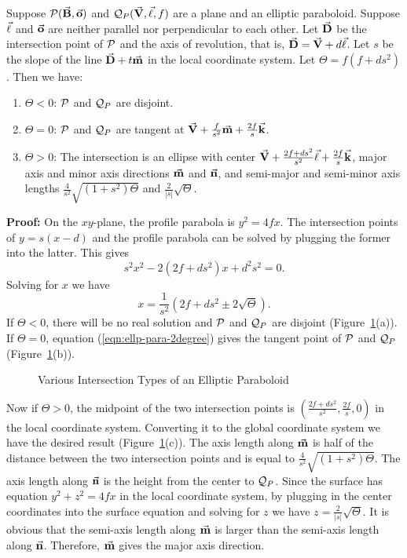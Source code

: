 \begin{theorem}
\label{thm:elliptic-paraboloid}
     Suppose ${\cal P}(\vec{\bf B},\vec{\bf o})$ and
${\cal Q}_P(\vec{\bf V},\vec{\bf \ell},f)$ are a plane and an elliptic paraboloid.
Suppose $\vec{\bf \ell}$ and $\vec{\bf o}$ are neither parallel nor perpendicular 
to each other.  Let $\vec{\bf D}$ be the intersection point of ${\cal P}$ and 
the axis of revolution, that is, $\vec{\bf D}=\vec{\bf V}+d\vec{\bf \ell}$.
Let $s$ be the slope of the line $\vec{\bf D}+t\vec{\bf m}$ in the local 
coordinate system.  Let $\Theta=f(f+ds^2)$.  Then we have:
\begin{enumerate}
     \item $\Theta<0$: ${\cal P}$ and ${\cal Q}_P$ are disjoint.
     \item $\Theta=0$: ${\cal P}$ and ${\cal Q}_P$ are tangent at
          $\vec{\bf V}+\frac{f}{s^2}\vec{\bf m}+\frac{2f}{s}\vec{\bf k}$.
     \item $\Theta>0$: The intersection is an ellipse with center
          $\vec{\bf V}+\frac{2f+ds^2}{s^2}\vec{\bf \ell}+\frac{2f}{s}\vec{\bf k}$,
          major axis and minor axis directions $\vec{\bf m}$ and $\vec{\bf n}$,
          and semi-major and semi-minor axis lengths 
          $\frac{4}{s^2}\sqrt{(1+s^2)\Theta}$ and $\frac{2}{|s|}\sqrt{\Theta}$.
\end{enumerate}
\end{theorem}
{\bf Proof:}  On the $xy$-plane, the profile parabola is $y^2=4fx$.  
The intersection points of $y=s(x-d)$ and the profile parabola can be solved 
by plugging the former into the latter.  This gives
\begin{equation}
\label{eqn:ellp-para-2degree}
     s^2x^2-2(2f+ds^2)x+d^2s^2=0.
\end{equation}
Solving for $x$ we have
\[ x = \frac{1}{s^2}(2f+ds^2\pm 2\sqrt{\Theta}).  \]
If $\Theta<0$, there will be no real solution and ${\cal P}$ and
${\cal Q}_P$ are disjoint (Figure~\ref{fig:para}(a)).  
If $\Theta=0$, equation (\ref{eqn:ellp-para-2degree}) gives the 
tangent point of ${\cal P}$ and ${\cal Q}_P$ (Figure~\ref{fig:para}(b)).
\begin{figure}
\vspace{6cm}
\caption{Various Intersection Types of an Elliptic Paraboloid}
\label{fig:para}
\end{figure}

     Now if $\Theta>0$, the midpoint of the two intersection points is
$\left(\frac{2f+ds^2}{s^2},\frac{2f}{s},0\right)$ in the local coordinate
system.  Converting it to the global coordinate system we have the desired
result (Figure~\ref{fig:para}(c)).  The axis length along $\vec{\bf m}$ is half 
of the distance between the two intersection points and is equal to 
$\frac{4}{s^2}\sqrt{(1+s^2)\Theta}$.  The axis length along $\vec{\bf n}$
is the height from the center to ${\cal Q}_P$.  Since the
surface has equation $y^2+z^2=4fx$ in the local coordinate system, by plugging
in the center coordinates into the surface equation and solving for $z$ we have
$z=\frac{2}{|s|}\sqrt{\Theta}$.  It is obvious that the semi-axis length
along $\vec{\bf m}$ is larger than the semi-axis length along $\vec{\bf n}$.
Therefore, $\vec{\bf m}$ gives the major axis direction.  \QED

